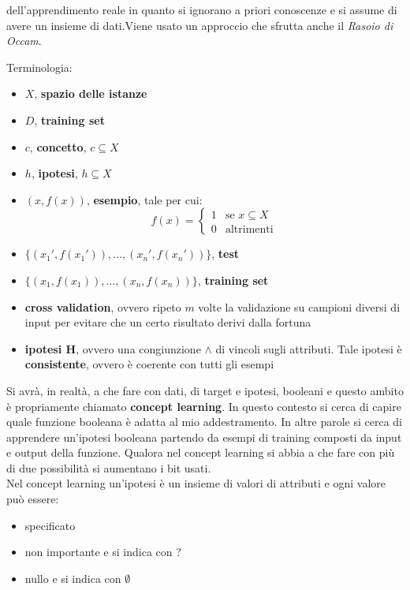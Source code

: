 \documentclass[a4paper,12pt, oneside]{book}
\begin{document}
dell'apprendimento reale in quanto si ignorano a priori conoscenze e si assume
di avere un insieme di dati.Viene usato un approccio che sfrutta anche il
\textit{Rasoio di Occam}.
\begin{shaded}
  Terminologia:
  \begin{itemize}
    \item $X$, \textbf{spazio delle istanze}
    \item $D$, \textbf{training set}
    \item $c$, \textbf{concetto}, $c\subseteq X$
    \item $h$, \textbf{ipotesi}, $h\subseteq X$
    \item $(x, f(x))$, \textbf{esempio}, tale per cui:
    \[f(x)=
      \begin{cases}
        1& \mbox{se } x\subseteq X\\
        0& \mbox{altrimenti}
      \end{cases}
    \]
    \item $\{(x_1',f(x_1')),\ldots,(x_n',f(x_n'))\}$, \textbf{test}
    \item $\{(x_1,f(x_1)),\ldots,(x_n,f(x_n))\}$, \textbf{training set}
    \item \textbf{cross validation}, ovvero ripeto $m$ volte la validazione su
    campioni diversi di input per evitare che un certo risultato derivi dalla
    fortuna 
    \item \textbf{ipotesi H}, ovvero una congiunzione $\land$ di vincoli sugli
    attributi. Tale ipotesi è \textbf{consistente}, ovvero è coerente con tutti
    gli esempi
  \end{itemize}
\end{shaded}
Si avrà, in realtà, a che fare con dati, di target e ipotesi,
booleani e questo ambito è propriamente chiamato \textbf{concept learning}. In
questo contesto si cerca di capire quale funzione booleana è adatta al mio
addestramento. In altre parole si cerca di apprendere un'ipotesi booleana
partendo da esempi di training composti da input e output della
funzione. Qualora nel concept learning si abbia a che fare con più di due 
possibilità si aumentano i bit usati.\\
Nel concept learning un'ipotesi è un insieme di valori di attributi e ogni
valore può essere:
\begin{itemize}
  \item specificato
  \item non importante e si indica con ?
  \item nullo e si indica con $\emptyset$
\end{itemize}
\end{document}
